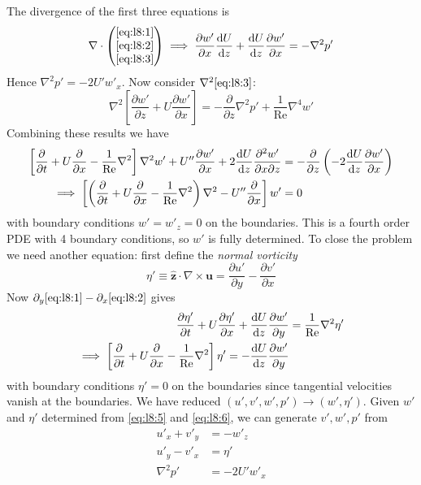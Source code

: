\documentclass{jknotes}
\renewcommand{\u}{\symbf{u}}
\newcommand{\ReN}{\text{Re}}
\begin{document}
The divergence of the first three equations is
\begin{equation}
	\nabla \cdot \begin{pmatrix} \eqref{eq:l8:1} \\ \eqref{eq:l8:2} \\
	\eqref{eq:l8:3} \end{pmatrix} \implies \frac{\partial w'}{\partial x}
	\frac{\diffd U}{\diffd z} + \frac{\diffd U}{\diffd z} \frac{\partial
	w'}{\partial x} = -\nabla^2 p'
\end{equation}
Hence $\nabla^2 p' = -2 U' w'_x$. Now consider $\nabla^2 \eqref{eq:l8:3}$:
\begin{equation}
	\nabla^2 \left[ \frac{\partial w'}{\partial z} + U \frac{\partial
	w'}{\partial x} \right] = -\frac{\partial}{\partial z} \nabla^2 p' +
	\frac{1}{\ReN} \nabla^4 w' 
\end{equation}
Combining these results we have
\begin{align}
	\left[ \frac{\partial}{\partial t} + U\frac{\partial}{\partial x} -
	\frac{1}{\ReN} \nabla^2 \right] \nabla^2 w' + U'' \frac{\partial
	w'}{\partial x} + 2 \frac{\diffd U}{\diffd z} \frac{\partial^2
w'}{\partial x \partial z} &= -\frac{\partial}{\partial z}\left( -2
\frac{\diffd U}{\diffd z} \frac{\partial w'}{\partial x}\right) \\
\implies \left[ \left( \frac{\partial}{\partial t} + U\frac{\partial}{\partial x} -
\frac{1}{\ReN} \nabla^2\right)\nabla^2 - U''\frac{\partial}{\partial x}\right]
w' &= 0 \label{eq:l8:5}
\end{align}
with boundary conditions $w' = w'_z = 0$ on the boundaries. This is a fourth
order PDE with 4 boundary conditions, so $w'$ is fully determined. To close
the problem we need another equation: first define the \emph{normal vorticity}
\begin{equation}
	\eta' \equiv \hat{\symbf{z}}\cdot \nabla \times \u = \frac{\partial
	u'}{\partial y} - \frac{\partial v'}{\partial x}
\end{equation}
Now $\partial_y \eqref{eq:l8:1} - \partial_x \eqref{eq:l8:2}$ gives
\begin{align}
	\frac{\partial\eta'}{\partial t} + U\frac{\partial \eta'}{\partial x} +
	\frac{\diffd U}{\diffd z} \frac{\partial w'}{\partial y} &= \frac{1}{\ReN}
	\nabla^2 \eta' \\
	\implies \left[ \frac{\partial}{\partial t} + U\frac{\partial}{\partial x} -
	\frac{1}{\ReN} \nabla^2\right] \eta' = -\frac{\diffd U}{\diffd z}
	\frac{\partial w'}{\partial y} \label{eq:l8:6}
\end{align}
with boundary conditions $\eta' = 0$ on the boundaries since tangential
velocities vanish at the boundaries. We have reduced $(u',v',w',p') \to (w',
\eta')$. Given $w'$ and $\eta'$ determined from \eqref{eq:l8:5} and
\eqref{eq:l8:6}, we can generate $v', w', p'$ from
\begin{align}
	u'_x + v'_y &= -w'_z \\
	u'_y - v'_x &= \eta' \\
	\nabla^2 p' &= - 2U'w'_x
\end{align}
\end{document}
